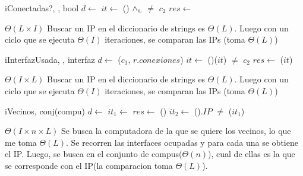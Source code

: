 \begin{Algoritmos}
  \begin{algoritmo}{iConectadas?}{, , }{bool}{}
     $d \gets$  
     $it \gets$  
    \While(){ $\land_{\mathrm{\scriptscriptstyle{L}}}$  $\neq$ $c_2$}{
       
    }
    $res \gets$  
  \end{algoritmo}
  \datosAlgoritmo{} %
  {} %
  {} %
  {$\Theta(L \times I)$} %
  {Buscar un IP en el diccionario de strings es $\Theta(L)$. Luego con un ciclo que se ejecuta $\Theta(I)$ iteraciones, se comparan las IPs (toma $\Theta(L)$)} %

  \begin{algoritmo}{iInterfazUsada}{, , }{interfaz}{}
     $d \gets$ \obtener($c_1$, $r.conexiones$) 
     $it \gets$  
    \While(){\sigSignif($it$) $\neq$ $c_2$}{
       
    }
    $res \gets$ \sigClave($it$) 
  \end{algoritmo}  
  \datosAlgoritmo{} %
  {} %
  {} %
  {$\Theta(I \times L)$} %
  {Buscar un IP en el diccionario de strings es $\Theta(L)$. Luego con un ciclo que se ejecuta $\Theta(I)$ iteraciones, se comparan las IPs (toma $\Theta(L)$)} %
  
  \begin{algoritmo}{iVecinos}{, }{conj(compu)}{}
     $d \gets$  
     $it_1 \gets$  
    $res \gets$ \vacio{} 
    \While(){}{
       $it_2 \gets$  
      \While(){$.IP$ $\neq$ \sigClave($it_1$)}{
         
      }
       
     } 
  \end{algoritmo}
  \datosAlgoritmo{} %
  {} %
  {} %
  {$\Theta(I \times n \times L)$} %
  {Se busca la computadora de la que se quiere los vecinos, lo que me toma $\Theta(L)$. Se recorren las interfaces ocupadas y para cada una se obtiene el IP. Luego, se busca en el conjunto de compus($\Theta(n)$), cual de ellas es la que se corresponde con el IP(la comparacion toma $\Theta(L)$).} %
  


\end{Algoritmos}
